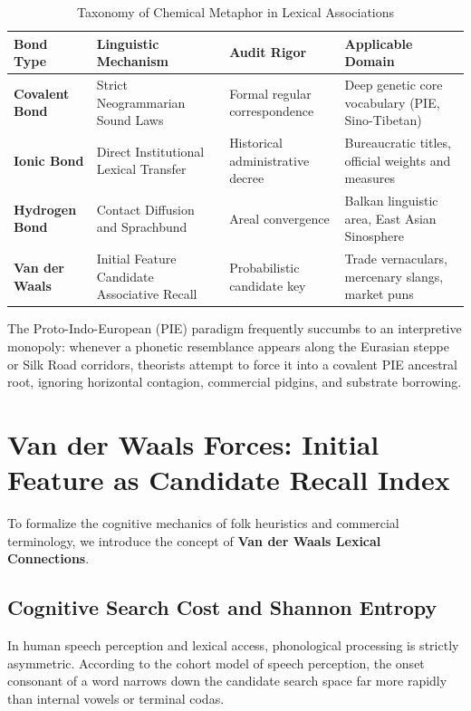 \documentclass[11pt,a4paper]{article}
\begin{document}
\begin{table}[h]
\centering
\small
\caption{Taxonomy of Chemical Metaphor in Lexical Associations}
\label{tab:chemical_bonds}
\begin{tabular}{@{}llll@{}}
\toprule
\textbf{Bond Type} & \textbf{Linguistic Mechanism} & \textbf{Audit Rigor} & \textbf{Applicable Domain} \\ \midrule
\textbf{Covalent Bond} & Strict Neogrammarian Sound Laws & Formal regular correspondence & Deep genetic core vocabulary (PIE, Sino-Tibetan) \\
\textbf{Ionic Bond} & Direct Institutional Lexical Transfer & Historical administrative decree & Bureaucratic titles, official weights and measures \\
\textbf{Hydrogen Bond} & Contact Diffusion and Sprachbund & Areal convergence & Balkan linguistic area, East Asian Sinosphere \\
\textbf{Van der Waals} & Initial Feature Candidate Associative Recall & Probabilistic candidate key & Trade vernaculars, mercenary slangs, market puns \\ \bottomrule
\end{tabular}
\end{table}

The Proto-Indo-European (PIE) paradigm frequently succumbs to an interpretive monopoly: whenever a phonetic resemblance appears along the Eurasian steppe or Silk Road corridors, theorists attempt to force it into a covalent PIE ancestral root, ignoring horizontal contagion, commercial pidgins, and substrate borrowing.

\section{Van der Waals Forces: Initial Feature as Candidate Recall Index}

To formalize the cognitive mechanics of folk heuristics and commercial terminology, we introduce the concept of \textbf{Van der Waals Lexical Connections}. 

\subsection{Cognitive Search Cost and Shannon Entropy}
In human speech perception and lexical access, phonological processing is strictly asymmetric. According to the cohort model of speech perception, the onset consonant of a word narrows down the candidate search space far more rapidly than internal vowels or terminal codas.
\end{document}
